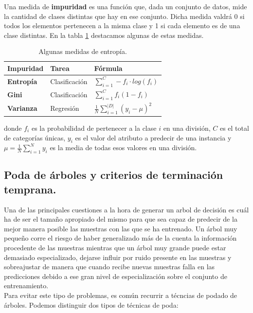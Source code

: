 Una medida de \textbf{impuridad} \cite{impurity} es una función que, dada un conjunto de datos, mide la cantidad de clases distintas que hay en ese conjunto. Dicha medida valdrá 0 si todos los elementos pertenecen a la misma clase y 1 si cada elemento es de una clase distintas. En la tabla \ref{tab:entropy} destacamos algunas de estas medidas.\\

\begin{table}[ht]
\centering
\begin{tabular}{|l|l|l|}
\hline
\textbf{Impuridad} & \textbf{Tarea} & \textbf{Fórmula}                         \\ \hline
\textbf{Entropía}  & Clasificación  & $\sum_{i=1}^{C}- f_i \cdot log (f_i)$    \\ \hline
\textbf{Gini}      & Clasificación  & $\sum_{i=1}^{C} f_i (1 - f_i)$           \\ \hline
\textbf{Varianza}  & Regresión      & $\frac{1}{N}\sum_{i=1}^|D|(y_i - \mu)^2$ \\ \hline
\end{tabular}
\caption{Algunas medidas de entropía.}
\label{tab:entropy}
\end{table}

donde $f_i$ es la probabilidad de pertenecer a la clase $i$ en una división, $C$ es el total de categorías únicas, $y_i$ es el valor del atributo a predecir de una instancia  y $\mu = \frac{1}{N} \sum_{i=1}^{N}y_i$ es la media de todas esos valores en una división.\\

\subsection{Poda de árboles y criterios de terminación temprana.}
Una de las principales cuestiones a la hora de generar un arbol de decisión es cuál ha de ser el tamaño apropiado del mismo para que sea capaz de predecir de la mejor manera posible las muestras con las que se ha entrenado. Un árbol muy pequeño corre el riesgo de haber generalizado más de la cuenta la información procedente de las muestras mientras que un árbol muy grande puede estar demasiado especializado, dejarse influir por ruido presente en las muestras y sobreajustar de manera que cuando recibe nuevas muestras falla en las predicciones debido a ese gran nivel de especialización sobre el conjunto de entrenamiento. \\

Para evitar este tipo de problemas, es común recurrir a técncias de podado de árboles. Podemos distinguir dos tipos de técnicas de poda:\\

